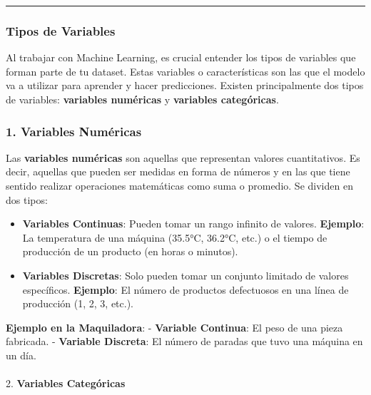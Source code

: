 \documentclass[
  10pt,
  letterpaper,
]{book}
\makeatletter
\let\oldparagraph\paragraph
\renewcommand{\paragraph}{
    \@ifstar
      \xxxParagraphStar
      \xxxParagraphNoStar
  }
\newcommand{\xxxParagraphStar}[1]{\oldparagraph*{#1}\mbox{}}
\newcommand{\xxxParagraphNoStar}[1]{\oldparagraph{#1}\mbox{}}
\makeatother
\begin{document}
\begin{center}\rule{0.5\linewidth}{0.5pt}\end{center}

\subsubsection{Tipos de Variables}\label{tipos-de-variables}

Al trabajar con Machine Learning, es crucial entender los tipos de
variables que forman parte de tu dataset. Estas variables o
características son las que el modelo va a utilizar para aprender y
hacer predicciones. Existen principalmente dos tipos de variables:
\textbf{variables numéricas} y \textbf{variables categóricas}.

\subsubsection{\texorpdfstring{1. \textbf{Variables
Numéricas}}{1. Variables Numéricas}}\label{variables-numuxe9ricas}

Las \textbf{variables numéricas} son aquellas que representan valores
cuantitativos. Es decir, aquellas que pueden ser medidas en forma de
números y en las que tiene sentido realizar operaciones matemáticas como
suma o promedio. Se dividen en dos tipos:

\begin{itemize}
\item
  \textbf{Variables Continuas}: Pueden tomar un rango infinito de
  valores. \textbf{Ejemplo}: La temperatura de una máquina (35.5°C,
  36.2°C, etc.) o el tiempo de producción de un producto (en horas o
  minutos).
\item
  \textbf{Variables Discretas}: Solo pueden tomar un conjunto limitado
  de valores específicos. \textbf{Ejemplo}: El número de productos
  defectuosos en una línea de producción (1, 2, 3, etc.).
\end{itemize}

\textbf{Ejemplo en la Maquiladora}: - \textbf{Variable Continua}: El
peso de una pieza fabricada. - \textbf{Variable Discreta}: El número de
paradas que tuvo una máquina en un día.

\paragraph{\texorpdfstring{2. \textbf{Variables
Categóricas}}{2. Variables Categóricas}}\label{variables-categuxf3ricas}
\end{document}
